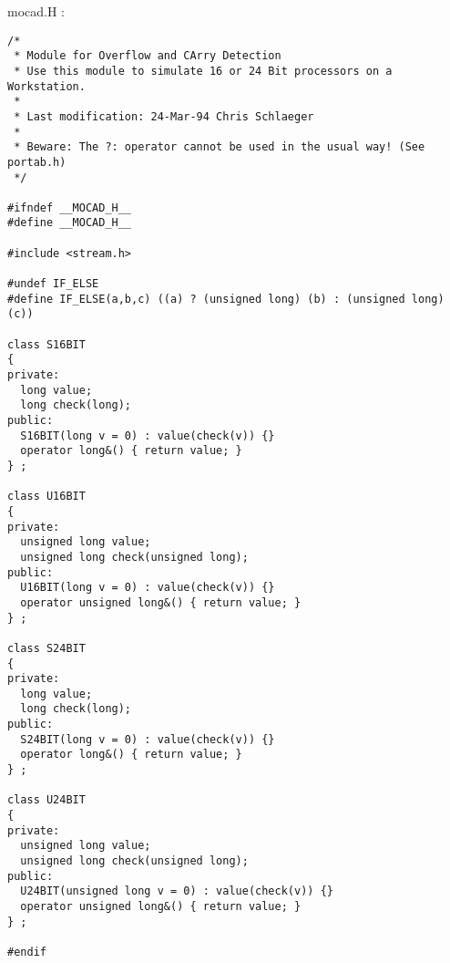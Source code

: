 mocad.H :

\begin{verbatim}
/*
 * Module for Overflow and CArry Detection
 * Use this module to simulate 16 or 24 Bit processors on a Workstation.
 *
 * Last modification: 24-Mar-94 Chris Schlaeger
 *
 * Beware: The ?: operator cannot be used in the usual way! (See portab.h)
 */

#ifndef __MOCAD_H__
#define __MOCAD_H__

#include <stream.h>

#undef IF_ELSE
#define IF_ELSE(a,b,c) ((a) ? (unsigned long) (b) : (unsigned long) (c))

class S16BIT
{
private:
  long value;
  long check(long);
public:
  S16BIT(long v = 0) : value(check(v)) {}
  operator long&() { return value; }
} ;

class U16BIT
{
private:
  unsigned long value;
  unsigned long check(unsigned long);
public:
  U16BIT(long v = 0) : value(check(v)) {}
  operator unsigned long&() { return value; }
} ;

class S24BIT
{
private:
  long value;
  long check(long);
public:
  S24BIT(long v = 0) : value(check(v)) {}
  operator long&() { return value; }
} ;

class U24BIT
{
private:
  unsigned long value;
  unsigned long check(unsigned long);
public:
  U24BIT(unsigned long v = 0) : value(check(v)) {}
  operator unsigned long&() { return value; }
} ;

#endif
\end{verbatim}
